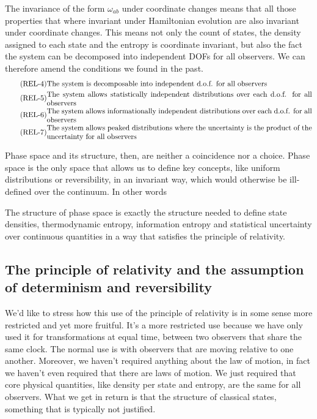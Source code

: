 The invariance of the form $\omega_{ab}$ under coordinate changes means that all those properties that where invariant under Hamiltonian evolution are also invariant under coordinate changes. This means not only the count of states, the density assigned to each state and the entropy is coordinate invariant, but also the fact the system can be decomposed into independent DOFs for all observers. We can therefore amend the conditions we found in the past. 
\begin{align}
	\tag{REL-4}\label{rp-cm-ir-condIndepDof}
	&\parbox{5in}{The system is decomposable into independent d.o.f. for all observers} \\
	\tag{REL-5}\label{rp-cm-ir-condIndepDistr}
	&\parbox{5in}{The system allows statistically independent distributions over each d.o.f. for all observers} \\
	\tag{REL-6}\label{rp-cm-ir-condIndepEntropy}
	&\parbox{5in}{The system allows informationally independent distributions over each d.o.f. for all observers} \\
	\tag{REL-7}\label{rp-cm-ir-condIndepUncertainty}
	&\parbox{5in}{The system allows peaked distributions where the uncertainty is the product of the uncertainty for all observers}
\end{align}

Phase space and its structure, then, are neither a coincidence nor a choice. Phase space is the only space that allows us to define key concepts, like uniform distributions or reversibility, in an invariant way, which would otherwise be ill-defined over the continuum. In other words
\begin{insight}
	The structure of phase space is exactly the structure needed to define state densities, thermodynamic entropy, information entropy and statistical uncertainty over continuous quantities in a way that satisfies the principle of relativity.
\end{insight}

\subsection{The principle of relativity and the assumption of determinism and reversibility}

We'd like to stress how this use of the principle of relativity is in some sense more restricted and yet more fruitful. It's a more restricted use because we have only used it for transformations at equal time, between two observers that share the same clock. The normal use is with observers that are moving relative to one another. Moreover, we haven't required anything about the law of motion, in fact we haven't even required that there are laws of motion. We just required that core physical quantities, like density per state and entropy, are the same for all observers. What we get in return is that the structure of classical states, something that is typically not justified.

